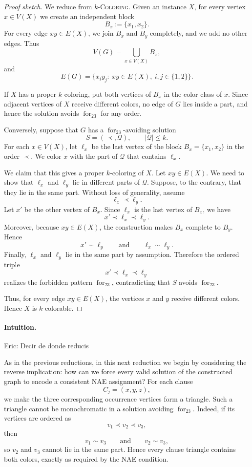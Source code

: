 \documentclass[12pt]{article}
\theoremstyle{plain}
\theoremstyle{definition}
\theoremstyle{remark}
\theoremstyle{definition}
\newcommand{\forlabel}{\mathrm{for}}
\DeclareRobustCommand{\forparam}[1]{%
  \ensuremath{\mathop{\forlabel}\nolimits_{#1}}%
}
\newcommand{\eric}[1]{%
  \textcolor{green!50!black}{Eric: #1}%
}
\newcommand{\forst}{\forparam{23}}
\begin{document}
\begin{proof}[Proof sketch]
We reduce from \(k\)-\textsc{Coloring}. Given an instance \(X\), for every vertex
\(x\in V(X)\) we create an independent block
\[
B_x:=\{x_1,x_2\}.
\]
For every edge \(xy\in E(X)\), we join \(B_x\) and \(B_y\) completely, and we add no other edges. Thus
\[
V(G)=\bigcup_{x\in V(X)} B_x,
\]
and
\[
E(G)=\{x_i y_j:\ xy\in E(X),\ i,j\in\{1,2\}\}.
\]

If \(X\) has a proper \(k\)-coloring, put both vertices of \(B_x\) in the color class of \(x\). Since adjacent
vertices of \(X\) receive different colors, no edge of \(G\) lies inside a part, and hence the solution avoids
\(\forst\) for any order.

Conversely, suppose that \(G\) has a \(\forst\)-avoiding solution
\[
S=(\prec,\mathcal Q),
\qquad |\mathcal Q|\le k.
\]
For each \(x\in V(X)\), let \(\ell_x\) be the last vertex of the block \(B_x=\{x_1,x_2\}\) in the order \(\prec\).
We color \(x\) with the part of \(\mathcal Q\) that contains \(\ell_x\).

We claim that this gives a proper \(k\)-coloring of \(X\). Let \(xy\in E(X)\). We need to show that
\(\ell_x\) and \(\ell_y\) lie in different parts of \(\mathcal Q\). Suppose, to the contrary, that they lie in the
same part. Without loss of generality, assume
\[
\ell_x \prec \ell_y.
\]
Let \(x'\) be the other vertex of \(B_x\). Since \(\ell_x\) is the last vertex of \(B_x\), we have
\[
x'\prec \ell_x\prec \ell_y.
\]
Moreover, because \(xy\in E(X)\), the construction makes \(B_x\) complete to \(B_y\). Hence
\[
x'\sim \ell_y
\qquad\text{and}\qquad
\ell_x\sim \ell_y.
\]
Finally, \(\ell_x\) and \(\ell_y\) lie in the same part by assumption. Therefore the ordered triple
\[
x'\prec \ell_x\prec \ell_y
\]
realizes the forbidden pattern \(\forst\), contradicting that \(S\) avoids \(\forst\).

Thus, for every edge \(xy\in E(X)\), the vertices \(x\) and \(y\) receive different colors. Hence \(X\) is
\(k\)-colorable.
\end{proof}




\paragraph{Intuition.}
\eric{Decir de donde reducis}
As in the previous reductions, in this next reduction we begin by considering the reverse implication: how can we force every valid solution
of the constructed graph to encode a consistent NAE assignment? For each clause
\[
C_j=(x,y,z),
\]
we make the three corresponding occurrence vertices form a triangle. Such a triangle cannot be monochromatic in a
solution avoiding \(\operatorname{for}_{23}\). Indeed, if its vertices are ordered as
\[
v_1\prec v_2\prec v_3,
\]
then
\[
v_1\sim v_3
\qquad\text{and}\qquad
v_2\sim v_3,
\]
so \(v_2\) and \(v_3\) cannot lie in the same part. Hence every clause triangle contains both colors, exactly as
required by the NAE condition.
\end{document}

